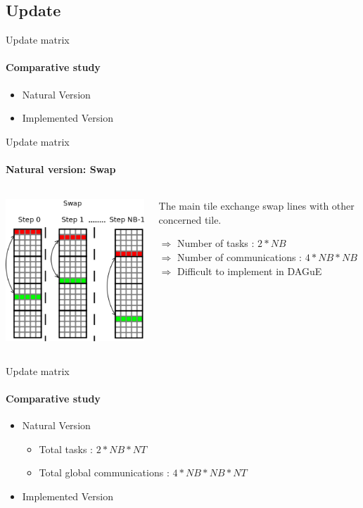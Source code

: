 \documentclass{beamer}
\begin{document}
\subsection{Update}

\begin{frame}{Update matrix}
\framesubtitle{Comparative study}
\begin{itemize}
\item Natural Version
\item Implemented Version
\end{itemize}
\end{frame}

\begin{frame}{Update matrix}
\framesubtitle{Natural version: Swap}
\begin{columns}
\begin{column}{.50\textwidth}
\begin{center}
\includegraphics[scale=0.5]{update_swap.png}
\end{center}
\end{column}
\hfill
\begin{column}{.50\textwidth}
The main tile exchange swap lines with other concerned tile.
\pause
\begin{exampleblock}{}
$\Longrightarrow$ Number of tasks : $2*NB$\\
$\Longrightarrow$ Number of communications : $4*NB*NB$\\
$\Longrightarrow$ Difficult to implement in DAGuE
\end{exampleblock}{}
\end{column}
\end{columns}
\end{frame}

\begin{frame}{Update matrix}
\framesubtitle{Comparative study}
\begin{itemize}
\item Natural Version
\begin{exampleblock}{}
\begin{itemize}
\item Total tasks : $2 * NB * NT$\\
\item Total global communications : $4 * NB * NB * NT$
\end{itemize}
\end{exampleblock}{}

\item Implemented Version
\end{itemize}
\end{frame}
\end{document}
